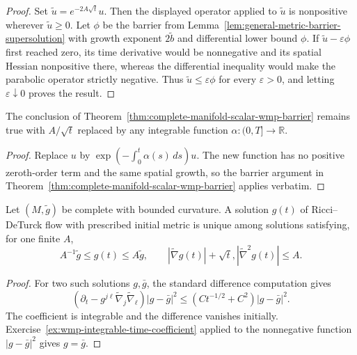 \begin{proof}
Set $\widetilde u=e^{-2A\sqrt t}u$.  Then the displayed operator applied to
$\widetilde u$ is nonpositive wherever $\widetilde u\geq0$.  Let $\phi$ be
the barrier from Lemma~\ref{lem:general-metric-barrier-supersolution} with
growth exponent $2\widetilde b$ and differential lower bound $\phi$.  If
$\widetilde u-\varepsilon\phi$ first reached zero, its time derivative would
be nonnegative and its spatial Hessian nonpositive there, whereas the
differential inequality would make the parabolic operator strictly negative.
Thus $\widetilde u\leq\varepsilon\phi$ for every $\varepsilon>0$, and letting
$\varepsilon\downarrow0$ proves the result.
\end{proof}

\begin{example}
\label{ex:wmp-integrable-time-coefficient}
The conclusion of Theorem~\ref{thm:complete-manifold-scalar-wmp-barrier}
remains true with $A/\sqrt t$ replaced by any integrable function
$\alpha:(0,T]\to\mathbb R$.
\end{example}

\begin{proof}
Replace $u$ by
$\exp(-\int_0^t\alpha(s)\,ds)u$.  The new function has no positive
zeroth-order term and the same spatial growth, so the barrier argument in
Theorem~\ref{thm:complete-manifold-scalar-wmp-barrier} applies verbatim.
\end{proof}

\begin{proposition}
\label{prop:ricci-deturck-uniqueness-controlled-class}
Let $(M,\widetilde g)$ be complete with bounded curvature.  A solution $g(t)$
of Ricci--DeTurck flow with prescribed initial metric is unique among solutions
satisfying, for one finite $A$,
\[
A^{-1}\widetilde g\leq g(t)\leq A\widetilde g,
\qquad
|\widetilde\nabla g(t)|+\sqrt t,|\widetilde\nabla^2g(t)|\leq A.
\]
\end{proposition}

\begin{proof}
For two such solutions $g,\bar g$, the standard difference computation gives
\[
(\partial_t-g^{j\ell}\widetilde\nabla_j\widetilde\nabla_\ell)
|g-\bar g|^2\leq(Ct^{-1/2}+C^2)|g-\bar g|^2.
\]
The coefficient is integrable and the difference vanishes initially.
Exercise~\ref{ex:wmp-integrable-time-coefficient} applied to the nonnegative
function $|g-\bar g|^2$ gives $g=\bar g$.
\end{proof}

